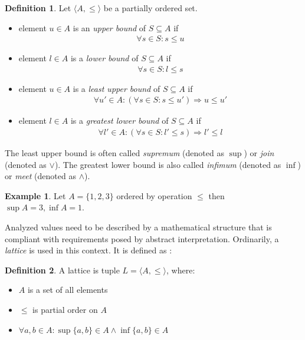 \documentclass[12pt,final,oneside]{fithesis2}
\theoremstyle{definition}
\newtheorem{definition}{Definition}[chapter]
\newtheorem{example}{Example}[chapter]
\begin{document}
\begin{definition}
Let $\langle A, \leq \rangle$ be a partially ordered set.

\begin{itemize}

\item element $u \in A$ is an \textit{upper bound} of $S \subseteq A$ if
\begin{align*}
\forall s \in S : s \leq u
\end{align*}

\item element $l \in A$ is a \textit{lower bound} of $S \subseteq A$ if
\begin{align*}
\forall s \in S : l \leq s
\end{align*}

\item element $u \in A$ is a \textit{least upper bound} of $S \subseteq A$ if
\begin{align*}
\forall u' \in A : (\forall s \in S : s \leq u') \Rightarrow u \leq u'
\end{align*}

\item element $l \in A$ is a \textit{greatest lower bound} of $S \subseteq A$ if
\begin{align*}
\forall l' \in A : (\forall s \in S : l' \leq s) \Rightarrow l' \leq l
\end{align*}

\end{itemize}

The least upper bound is often called \textit{supremum} (denoted as $\sup$)
or \textit{join} (denoted as $\lor$). The greatest lower bound is also
called \textit{infimum} (denoted as $\inf$) or \textit{meet} (denoted as
$\land$).
\end{definition}

\begin{example}
Let $A = \{ 1, 2, 3 \}$ ordered by operation $\leq$ then
$\sup A = 3, \inf A = 1$.
\end{example}

Analyzed values need to be described by a mathematical structure that is
compliant with requirements posed by abstract interpretation. Ordinarily,
a \textit{lattice} is used in this context. It is defined as
\cite{Burris81-1}:

\begin{definition}
A lattice is tuple $L = \langle A, \leq \rangle$, where:

\begin{itemize}
\item $A$ is a set of all elements
\item $\leq$ is partial order on $A$
\item $\forall a, b \in A : \sup \{ a, b \} \in A \land \inf \{ a, b \} \in A$
\end{itemize}
\end{definition}
\end{document}
